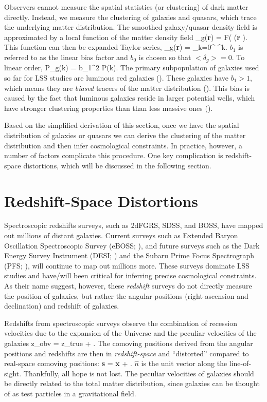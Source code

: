 Observers cannot measure the spatial statistics (or clustering) of dark matter 
directly. Instead, we measure the clustering of galaxies and quasars, which trace
the underlying matter distribution. The smoothed galaxy/quasar density field is 
approximated by a local function of the matter density field
\beq
\delta_g({\bf r}) = F( \delta({\bf r} ). 
\eeq
This function can then be expanded Taylor series,
\beq
\delta_g({\bf r}) = \sum\limits_{k=0}^{\infty}  \delta^k. 
\eeq
$b_1$ is referred to as the linear bias factor and $b_0$ is chosen so that
$<\delta_g> = 0$. To linear order, 
\beq
P_g(k) = b_1^2 P(k). 
\eeq
The primary subpopulation of galaxies used so far for LSS studies are luminous 
red galaxies (). These galaxies have $b_1 > 1$, which 
means they are {\em biased} tracers of the matter distribution (). 
This bias is caused by the fact that luminous galaxies reside in larger potential 
wells, which have stronger clustering properties than than less massive ones (). 

Based on the simplified derivation of this section, once we have the spatial 
distribution of galaxies or quasars we can derive the clustering of the matter
distribution and then infer cosmological constraints. In practice, however, a
number of factors complicate this procedure. One key complication is redshift-space
distortions, which will be discussed in the following section.

\section{Redshift-Space Distortions} \label{sec:rsd}
Spectroscopic redshifts surveys, such as 2dFGRS, SDSS, and BOSS, have mapped out
millions of distant galaxies. Current surveys such as Extended Baryon Oscillation 
Spectroscopic Survey (eBOSS; \citealt{Dawson:2015aa}), and future surveys such as 
the Dark Energy Survey Instrument (DESI; \citealt{Schlegel:2011aa, Morales:2012aa, Makarem:2014aa}) 
and the Subaru Prime Focus Spectrograph (PFS; \citealt{Takada:2014aa}), will 
continue to map out millions more. These surveys dominate LSS studies and have/will 
been critical for inferring precise cosmological constraints. As their name suggest, 
however, these {\em redshift} surveys do not directly measure the position of 
galaxies, but rather the angular positions (right ascension and declination) and
redshift of galaxies. 

Redshifts from spectroscopic surveys observe the combination of recession 
velocities due to the expansion of the Universe and the peculiar velocities of the galaxies 
\beq
z_{obv} = z_{true} +  .
\eeq 
The comoving positions derived from the angular positions and redshifts are then
in {\em redshift-space} and ``distorted'' compared to real-space comoving positions:
\beq
{\bf s} = {\bf x} +  .
\eeq 
$\hat{n}$ is the unit vector along the line-of-sight. Thankfully, all hope is not 
lost. The peculiar velocities of galaxies should be directly related to the total 
matter distribution, since galaxies can be thought of as test particles in a 
gravitational field. 

